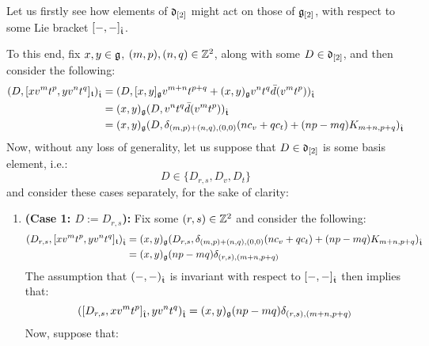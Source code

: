         \begin{remark} \label{remark: derivation_action_on_multiloop_algebras}
            Let us firstly see how elements of $\mathfrak{d}_{[2]}$ might act on those of $\mathfrak{g}_{[2]}$, with respect to some Lie bracket $[-, -]_{\hat{\mathfrak{t}}}$. 

            To this end, fix $x, y \in \mathfrak{g}$, $(m, p), (n, q) \in \mathbb{Z}^2$, along with some $D \in \mathfrak{d}_{[2]}$, and then consider the following:
                $$
                    \begin{aligned}
                        ( D, [x v^m t^p, y v^n t^q]_{\mathfrak{t}} )_{\hat{\mathfrak{t}}} & = ( D, [x, y]_{\mathfrak{g}} v^{m + n} t^{p + q} + (x, y)_{\mathfrak{g}} v^n t^q \bar{d}( v^m t^p ) )_{\hat{\mathfrak{t}}}
                        \\
                        & = (x, y)_{\mathfrak{g}} ( D, v^n t^q \bar{d}( v^m t^p ) )_{\hat{\mathfrak{t}}}
                        \\
                        & = (x, y)_{\mathfrak{g}} ( D, \delta_{(m, p) + (n, q), (0, 0)} ( n c_v + q c_t ) + (np - mq) K_{m + n, p + q} )_{\hat{\mathfrak{t}}}
                    \end{aligned}
                $$
            Now, without any loss of generality, let us suppose that $D \in \mathfrak{d}_{[2]}$ is some basis element, i.e.:
                $$D \in \{ D_{r, s}, D_v, D_t \}$$
            and consider these cases separately, for the sake of clarity:
            \begin{enumerate}
                \item \textbf{(Case 1: $D := D_{r, s}$):} Fix some $(r, s) \in \mathbb{Z}^2$ and consider the following: 
                    $$
                        \begin{aligned}
                            ( D_{r, s}, [x v^m t^p, y v^n t^q]_{\mathfrak{t}} )_{\hat{\mathfrak{t}}} & = (x, y)_{\mathfrak{g}} ( D_{r, s}, \delta_{(m, p) + (n, q), (0, 0)} ( n c_v + q c_t ) + (np - mq) K_{m + n, p + q} )_{\hat{\mathfrak{t}}}
                            \\
                            & = (x, y)_{\mathfrak{g}} (np - mq) \delta_{(r, s), (m + n, p + q)}
                        \end{aligned}
                    $$
                The assumption that $(-, -)_{\hat{\mathfrak{t}}}$ is invariant with respect to $[-, -]_{\hat{\mathfrak{t}}}$ then implies that:
                    $$( [D_{r, s}, x v^m t^p]_{\hat{\mathfrak{t}}}, y v^n t^q )_{\hat{\mathfrak{t}}} = (x, y)_{\mathfrak{g}} (np - mq) \delta_{(r, s), (m + n, p + q)}$$
                Now, suppose that:

\end{enumerate}
\end{remark}
